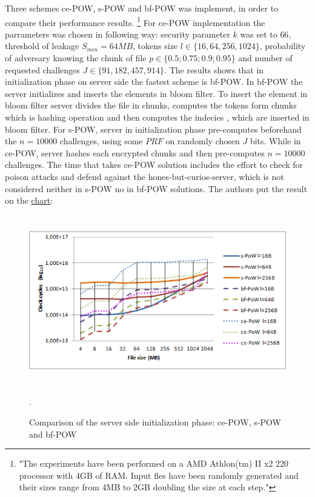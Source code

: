 \documentclass[12pt]{article}
\begin{document}
Three schemes ce-POW, s-POW and bf-POW was implement, in order to compare their performance results. \footnote{"The experiments have been performed on a AMD Athlon(tm) II x2 220
processor with 4GB of RAM. Input fles have been randomly generated and their sizes range from 4MB to 2GB doubling the size at each step."} For ce-POW implementation the parrameters was chosen in following way: security parameter $k$ was set to $66$, threshold of leakage $S_{min} = 64MB$, tokens size $l \in \{16, 64, 256,1024\} $, probability of adversary knowing the  chunk of file $p \in \{0.5; 0.75; 0.9; 0.95\}$ and number of requested challenges $J \in \{91, 182, 457, 914\}$.
The results shows that in initialization phase on server side the fastest scheme is bf-POW. In bf-POW the server initializes and inserts the elements in bloom filter. To insert the element in bloom filter server divides the file in chunks, computes the tokens form chunks which is hashing operation and then computes the indecies , which are inserted  in bloom filter. For s-POW, server in initialization phase pre-computes beforehand the $n=10000$ challenges, using some $PRF$ on randomly chosen $J$ bits. While in ce-POW, server hashes each encrypted chunks and then pre-computes $n=10000$ challenges. The time that takes ce-POW solution includes the effort to check for poison attacks and defend against the hones-but-curios-server, which is not considered neither in s-POW no in bf-POW solutions. The authors put the result on the \hyperref[fig:ce-POW]{chart}:

\begin{figure}[ht] 
\begin{center}
\includegraphics[height=210pt,width=400pt]{ce-POW}
\caption{Comparison of the server side initialization phase: ce-POW, s-POW and bf-POW \cite{ce-POW}}
\label{fig:ce-POW} .
\end{center}
\end{figure}
\end{document}
